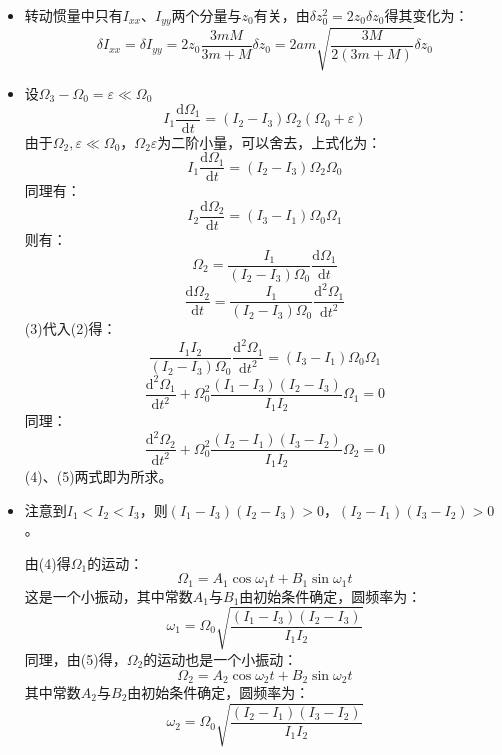 \documentclass[a4paper,fontset=windows]{ctexart}
\begin{document}
\begin{itemize}
        \medskip
        \item[6.(d)]
        转动惯量中只有$I_{xx}$、$I_{yy}$两个分量与$z_0$有关，由$\delta z_0^2 = 2z_0\delta z_0$得其变化为：
        \[
        \delta I_{xx} = \delta I_{yy} = 2z_0\frac{3mM}{3m+M}\delta z_0 = 2am\sqrt{\frac{3M}{2(3m+M)}}\delta z_0
        \]

        \setcounter{equation}{0}
        \bigskip
        \item[7.(a)]
        设$\varOmega_3 - \varOmega_0 = \varepsilon \ll \varOmega_0$
        \[
        I_1\frac{\mathrm{d}\varOmega_1}{\mathrm{d}t} = (I_2 - I_3)\varOmega_2(\varOmega_0+\varepsilon)
        \]
        由于$\varOmega_2,\varepsilon \ll \varOmega_0$，$\varOmega_2\varepsilon$为二阶小量，可以舍去，上式化为：
        \begin{equation}
        I_1\frac{\mathrm{d}\varOmega_1}{\mathrm{d}t} = (I_2 - I_3)\varOmega_2\varOmega_0
        \end{equation}
        同理有：
        \begin{equation}
        I_2\frac{\mathrm{d}\varOmega_2}{\mathrm{d}t} = (I_3 - I_1)\varOmega_0\varOmega_1
        \end{equation}
        则有：
        \[
        \varOmega_2 = \frac{I_1}{(I_2 - I_3)\varOmega_0}\frac{\mathrm{d}\varOmega_1}{\mathrm{d}t}
        \]
        \begin{equation}
        \frac{\mathrm{d}\varOmega_2}{\mathrm{d}t} = \frac{I_1}{(I_2 - I_3)\varOmega_0}\frac{\mathrm{d}^2\varOmega_1}{\mathrm{d}t^2}
        \end{equation}
        (3)代入(2)得：
        \[
        \frac{I_1I_2}{(I_2 - I_3)\varOmega_0}\frac{\mathrm{d}^2\varOmega_1}{\mathrm{d}t^2} = (I_3 - I_1)\varOmega_0\varOmega_1
        \]
        \begin{equation}
        \frac{\mathrm{d}^2\varOmega_1}{\mathrm{d}t^2} + \varOmega_0^2\frac{(I_1-I_3)(I_2-I_3)}{I_1I_2}\varOmega_1 = 0
        \end{equation}
        同理：
        \begin{equation}
        \frac{\mathrm{d}^2\varOmega_2}{\mathrm{d}t^2} + \varOmega_0^2\frac{(I_2-I_1)(I_3-I_2)}{I_1I_2}\varOmega_2 = 0
        \end{equation}
        (4)、(5)两式即为所求。

        \medskip
        \item[7.(b)]
        注意到$I_1<I_2<I_3$，则$(I_1-I_3)(I_2-I_3)>0$，$(I_2-I_1)(I_3-I_2)>0$。

        由(4)得$\varOmega_1$的运动：
        \[
        \varOmega_1 = A_1\cos\omega_1t + B_1\sin\omega_1t
        \]
        这是一个小振动，其中常数$A_1$与$B_1$由初始条件确定，圆频率为：
        \[
        \omega_1 = \varOmega_0\sqrt{\frac{(I_1-I_3)(I_2-I_3)}{I_1I_2}}
        \]
        同理，由(5)得，$\varOmega_2$的运动也是一个小振动：
        \[
        \varOmega_2 = A_2\cos\omega_2t + B_2\sin\omega_2t
        \]
        其中常数$A_2$与$B_2$由初始条件确定，圆频率为：
        \[
        \omega_2 = \varOmega_0\sqrt{\frac{(I_2-I_1)(I_3-I_2)}{I_1I_2}}
        \]


\end{itemize}
\end{document}
